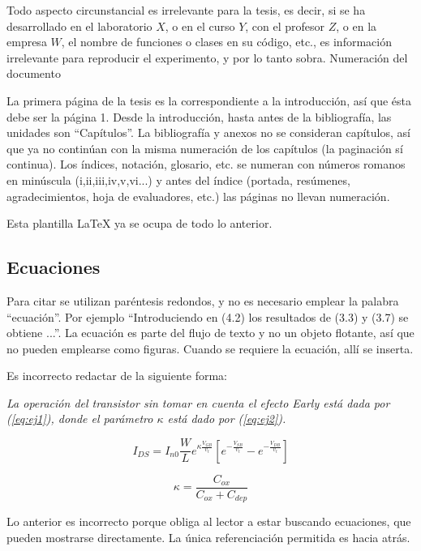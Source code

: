 Todo aspecto circunstancial es irrelevante para la tesis, es decir, si se ha
desarrollado en el laboratorio $X$, o en el curso $Y$, con el profesor $Z$, o
en la empresa $W$, el nombre de funciones o clases en su código, etc., es
información irrelevante para reproducir el experimento, y por lo tanto sobra.
Numeración del documento

La primera página de la tesis es la correspondiente a la introducción, así que
ésta debe ser la página 1. Desde la introducción, hasta antes de la
bibliografía, las unidades son ``Capítulos''. La bibliografía y anexos no se
consideran capítulos, así que ya no continúan con la misma numeración de los
capítulos (la paginación sí continua). Los índices, notación, glosario, etc. se
numeran con números romanos en minúscula (i,ii,iii,iv,v,vi...) y antes del
índice (portada, resúmenes, agradecimientos, hoja de evaluadores, etc.) las
páginas no llevan numeración. 

Esta plantilla LaTeX ya se ocupa de todo lo anterior.

\subsection{Ecuaciones}

Para citar  se utilizan paréntesis redondos, y no es necesario
emplear la palabra ``ecuación''. Por ejemplo ``Introduciendo en (4.2) los
resultados de (3.3) y (3.7) se obtiene ...''. La ecuación es parte del flujo de
texto y no un objeto flotante, así que no pueden emplearse como figuras. Cuando
se requiere la ecuación, allí se inserta.  

Es incorrecto redactar de la siguiente forma: 

\textsl{La operación del transistor sin tomar en cuenta el efecto Early está
  dada por (\ref{eq:ej1}), donde el parámetro $\kappa$ está dado por
  (\ref{eq:ej2}).}

\begin{equation} \label{eq:ej1}
  I_{DS}
  =
  I_{n0} \frac{W}{L}e^{\kappa \frac{V_{GB}}{v_t}}
  \left[
    e^{-\frac{V_{SB}}{v_t}}
    -
    e^{-\frac{V_{DB}}{v_t}}
  \right]
\end{equation}

\begin{equation} \label{eq:ej2}
  \kappa = \frac{C_{ox}}{C_{ox}+C_{dep}}
\end{equation}

Lo anterior es incorrecto porque obliga al lector a estar buscando ecuaciones,
que pueden mostrarse directamente.  La única referenciación permitida es hacia
atrás.

